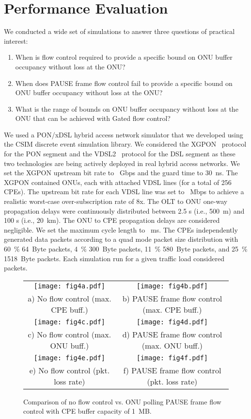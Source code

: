 \documentclass[pdftex,journal]{IEEEtran}
\begin{document}
\section{Performance Evaluation}   \label{sec:experiment}
We conducted a wide set of simulations
to answer three questions of practical interest:
\begin{enumerate}
  \item When is flow control required to provide a specific bound on ONU
    buffer occupancy without loss at the ONU?
  \item When does PAUSE frame flow control fail to provide a specific bound
     on ONU buffer occupancy without loss at the ONU?
  \item What is the range of bounds on ONU buffer occupancy without loss
   at the ONU that can be achieved with Gated flow control?
\end{enumerate}
We used a PON/xDSL hybrid access network simulator that we developed
using the CSIM discrete event simulation library. We considered the
XGPON~\cite{XGPON} protocol for the PON segment and the
VDSL2~\cite{VDSL} protocol for the DSL segment as these two
technologies are being actively deployed in real hybrid access
networks. We set the XGPON upstream bit rate to ~Gbps
and the guard time to 30~ns. The XGPON contained  ONUs, each
with  attached VDSL lines (for a total of 256 CPEs). The
upstream bit rate for each VDSL line was set to ~Mbps to
achieve a realistic worst-case over-subscription rate of 8x. The OLT
to ONU one-way propagation delays  were continuously
distributed between 2.5 s (i.e., 500~m) and 100 s (i.e.,
20~km). The ONU to CPE  propagation delays  are considered
negligible. We set the maximum cycle length to ~ms. The CPEs
independently generated data packets according to a quad mode packet
size distribution with 60~\% 64~Byte packets, 4~\% 300~Byte packets,
11~\% 580~Byte packets, and 25~\% 1518~Byte packets.
Each simulation run for a given traffic load considered  packets.

\begin{figure*}[t]
\centering
\begin{tabular}{cc}
\texttt{[image: fig4a.pdf]} &
\texttt{[image: fig4b.pdf]} \\
\footnotesize{a) No flow control (max. CPE buff.)} &
\footnotesize{b) PAUSE frame flow control (max. CPE buff.)} \\

\texttt{[image: fig4c.pdf]} &
\texttt{[image: fig4d.pdf]} \\
\footnotesize{c) No flow control (max. ONU buff.)} &
\footnotesize{d) PAUSE frame flow control (max. ONU buff.)} \\

\texttt{[image: fig4e.pdf]} &
\texttt{[image: fig4f.pdf]} \\
\footnotesize{e) No flow control (pkt. loss rate)} &
\footnotesize{f) PAUSE frame flow control (pkt. loss rate)} \\
\end{tabular}
\caption{Comparison of no flow control vs. ONU polling PAUSE frame flow
control with CPE buffer capacity of 1~MB.}
\label{fig:noflow_vs_pause_100KB}
\end{figure*}
\end{document}

